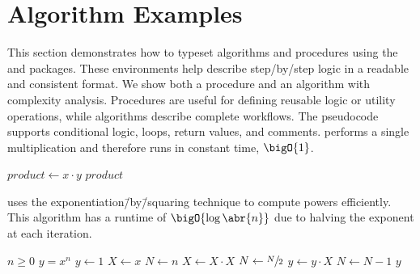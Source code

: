 \section{Algorithm Examples}

This section demonstrates how to typeset algorithms and procedures using the  and  packages. These environments help describe step\-/by\-/step logic in a readable and consistent format. We show both a procedure and an algorithm with complexity analysis. Procedures are useful for defining reusable logic or utility operations, while algorithms describe complete workflows. The pseudocode supports conditional logic, loops, return values, and comments.  performs a single multiplication and therefore runs in constant time, $\bigO{1}$.

\begin{procedure}[H]
    \caption{Multiply two integers.}
    \begin{algorithmic}[1]
            \State $product \gets x \cdot y$
            \State \Return $product$
        \EndProcedure
    \end{algorithmic}
    \label{pro:mult}
\end{procedure}

 uses the exponentiation\=/by\=/squaring technique to compute powers efficiently. This algorithm has a runtime of $\bigO{\log\abr{n}}$ due to halving the exponent at each iteration.

\begin{algorithm}[H]
    \caption{Exponentiation by squaring.}
    \label{alg:expBySquaring}
    \begin{algorithmic}[1]
            \Require $n \geq 0$
            \Ensure $y = x^n$
            \State $y \gets 1$
            \State $X \gets x$
            \State $N \gets n$
                    \State $X \gets X \cdot X$
                    \State $N \gets \sfrac{N}{2}$ 
                \Else
                    \State $y \gets y \cdot X$
                    \State $N \gets N - 1$
                \EndIf
            \EndWhile
            \State \Return $y$
        \EndFunction
    \end{algorithmic}
\end{algorithm}
